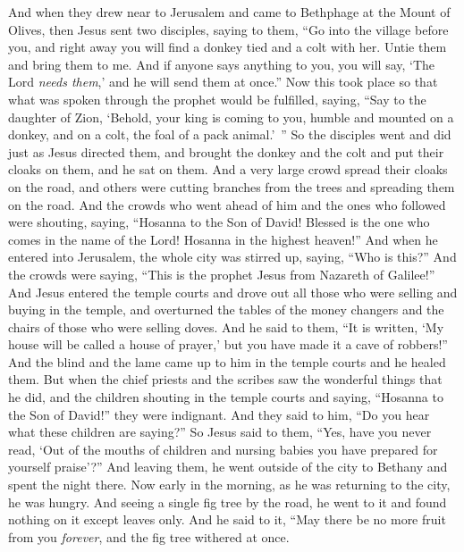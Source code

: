 \begin{biblechapter} %
 And when they drew near to Jerusalem and came to Bethphage at the Mount of Olives, then Jesus sent two disciples,
\verse saying to them, “Go into the village before you, and right away you will find a donkey tied and a colt with her. Untie them and bring them to me.
\verse And if anyone says anything to you, you will say, ‘The Lord \textit{needs them},’ and he will send them at once.”
\verse Now this took place so that what was spoken through the prophet would be fulfilled, saying,
\verse “Say to the daughter of Zion, 
‘Behold, your king is coming to you, 
humble and mounted on a donkey, 
and on a colt, the foal of a pack animal.’ ”
\verse So the disciples went and did just as Jesus directed them,
\verse and brought the donkey and the colt and put their cloaks on them, and he sat on them.
\verse And a very large crowd spread their cloaks on the road, and others were cutting branches from the trees and spreading them on the road.
\verse And the crowds who went ahead of him and the ones who followed were shouting, saying, “Hosanna to the Son of David! 
Blessed is the one who comes in the name of the Lord! 
Hosanna in the highest heaven!”
\verse And when he entered into Jerusalem, the whole city was stirred up, saying, “Who is this?”
\verse And the crowds were saying, “This is the prophet Jesus from Nazareth of Galilee!”
 And Jesus entered the temple courts and drove out all those who were selling and buying in the temple, and overturned the tables of the money changers and the chairs of those who were selling doves.
\verse And he said to them, “It is written, ‘My house will be called a house of prayer,’ but you have made it a cave of robbers!”
\verse And the blind and the lame came up to him in the temple courts and he healed them.
\verse But when the chief priests and the scribes saw the wonderful things that he did, and the children shouting in the temple courts and saying, “Hosanna to the Son of David!” they were indignant.
\verse And they said to him, “Do you hear what these children are saying?” So Jesus said to them, “Yes, have you never read, ‘Out of the mouths of children and nursing babies you have prepared for yourself praise’?”
\verse And leaving them, he went outside of the city to Bethany and spent the night there.
 Now early in the morning, as he was returning to the city, he was hungry.
\verse And seeing a single fig tree by the road, he went to it and found nothing on it except leaves only. And he said to it, “May there be no more fruit from you \textit{forever}, and the fig tree withered at once.

\end{biblechapter}
